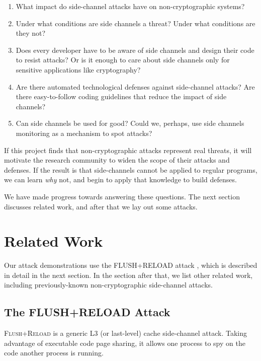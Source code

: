 \documentclass{acm_proc_article-sp}
\begin{document}
\begin{enumerate}
\item What impact do side-channel attacks have on non-cryptographic systems?

\item Under what conditions are side channels a threat? Under what conditions
      are they not?

\item Does every developer have to be aware of side channels and design their
      code to resist attacks? Or is it enough to care about side channels only
      for sensitive applications like cryptography?

\item Are there automated technological defenses against side-channel attacks?
      Are there easy-to-follow coding guidelines that reduce the impact of side
      channels?

\item Can side channels be used for good? Could we, perhaps, use side channels
      monitoring as a mechanism to spot attacks?
\end{enumerate}

If this project finds that non-cryptographic attacks represent real threats, it
will motivate the research community to widen the scope of their attacks and
defenses. If the result is that side-channels cannot be applied to regular
programs, we can learn \emph{why} not, and begin to apply that knowledge to
build defenses.

We have made progress towards answering these questions. The next section
discusses related work, and after that we lay out some attacks.

\section{Related Work}
\label{sec:relwork}

Our attack demonstrations use the FLUSH+RELOAD attack \cite{yarom2013flush},
which is described in detail in the next section. In the section after that, we
list other related work, including previously-known non-cryptographic
side-channel attacks.

\subsection{The FLUSH+RELOAD Attack}

\textsc{Flush+Reload} \cite{yarom2013flush} is a generic L3 (or last-level)
cache side-channel attack. Taking advantage of executable code page sharing, it
allows one process to spy on the code another process is running.
\end{document}
